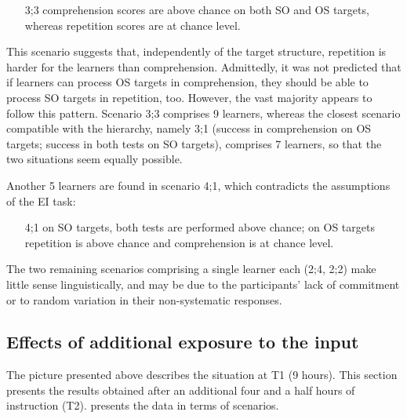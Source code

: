 \begin{itemize}
    \item[3;3]  comprehension scores are above chance on both SO and OS targets, whereas repetition scores are at chance level. 
\end{itemize}

This scenario suggests that, independently of the target structure, repetition is harder for the learners than comprehension. Admittedly, it was not predicted that if learners can process OS targets in comprehension, they should be able to process SO targets in repetition, too. However, the vast majority appears to follow this pattern. Scenario 3;3 comprises 9 learners, whereas the closest scenario compatible with the hierarchy, namely 3;1 (success in comprehension on OS targets; success in both tests on SO targets), comprises 7 learners, so that the two situations seem equally possible. 

Another 5 learners are found in scenario 4;1, which contradicts the assumptions of the EI task: 

\begin{itemize}
    \item[4;1]  on SO targets, both tests are performed above chance; on OS targets repetition is above chance and comprehension is at chance level. 
\end{itemize}

The two remaining scenarios comprising a single learner each (2;4, 2;2) make little sense linguistically, and may be due to the participants’ lack of commitment or to random variation in their non-systematic responses. 

\subsection{Effects of additional exposure to the input}\label{sec:06:3.1}

The picture presented above describes the situation at T1 (9 hours). This section presents the results obtained after an additional four and a half hours of instruction (T2).  presents the data in terms of scenarios.

